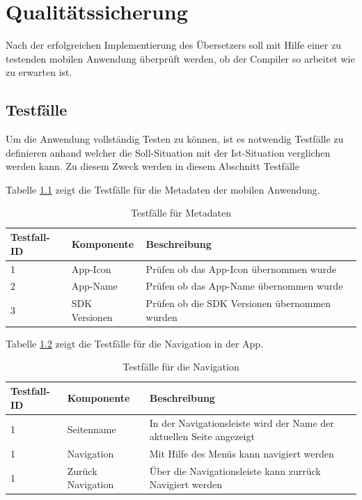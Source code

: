 \chapter{Qualitätssicherung}
\label{chap:Qualitätssicherung}

Nach der erfolgreichen Implementierung des Übersetzers soll mit Hilfe einer zu testenden mobilen Anwendung überprüft werden,  ob der Compiler so arbeitet wie zu erwarten ist.  
\section{Testfälle}
Um die Anwendung vollständig Testen zu können, ist es notwendig Testfälle zu definieren anhand welcher die Soll-Situation mit der Ist-Situation verglichen werden kann.  Zu diesem Zweck werden in diesem Abschnitt Testfälle 

Tabelle \ref{tab:MetadataTests} zeigt die Testfälle für die Metadaten der mobilen Anwendung. 


\begin{table}[!ht]
\begin{tabularx}{\textwidth}{l|l|X}
   \textbf{Testfall-ID} & \textbf{Komponente} & \textbf{Beschreibung} \\
\hline
1             & App-Icon           	& Prüfen ob das App-Icon übernommen wurde                      			 \\ 
2             & App-Name          	& Prüfen ob das App-Name übernommen wurde                      		 \\ 
3             & SDK Versionen      & Prüfen ob die SDK Versionen übernommen wurden                      \\ 
\end{tabularx}
\caption{Testfälle für Metadaten}
 \label{tab:MetadataTests}
\end{table}

Tabelle \ref{tab:MenuTests} zeigt die Testfälle für die Navigation in der App. 


\begin{table}[!ht]
\begin{tabularx}{\textwidth}{l|l|X}
   \textbf{Testfall-ID} & \textbf{Komponente} & \textbf{Beschreibung} \\
\hline
1             & Seitenname           	& In der Navigationsleiste wird der Name der aktuellen Seite angezeigt                      			 \\ 
1             & Navigation         	& Mit Hilfe des Menüs kann navigiert werden                      			 \\ 
1             & Zurück Navigation           	& Über die Navigationsleiste kann zurrück Navigiert werden                      			 \\ 
\end{tabularx}
\caption{Testfälle für die Navigation}
 \label{tab:MenuTests}
\end{table}

